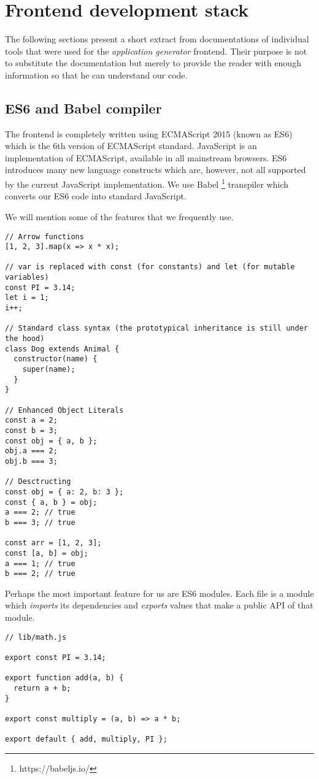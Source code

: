 \chapter{Frontend development stack}
\label{att:devstack}

The following sections present a short extract from documentations of individual tools that were used for the \emph{application generator} frontend. Their purpose is not to substitute the documentation but merely to provide the reader with enough information so that he can understand our code.

\section{ES6 and Babel compiler}

The frontend is completely written using ECMAScript 2015 \cite{es6} (known as ES6) which is the 6th version of ECMAScript standard. JavaScript is an implementation of ECMAScript, available in all mainstream browsers. ES6 introduces many new language constructs which are, however, not all supported by the current JavaScript implementation. We use Babel \footnote{https://babeljs.io/} transpiler which converts our ES6 code into standard JavaScript.

We will mention some of the features that we frequently use.

\begin{verbatim}
// Arrow functions
[1, 2, 3].map(x => x * x);

// var is replaced with const (for constants) and let (for mutable variables)
const PI = 3.14;
let i = 1;
i++;

// Standard class syntax (the prototypical inheritance is still under the hood)
class Dog extends Animal {
  constructor(name) {
    super(name);
  }
}

// Enhanced Object Literals
const a = 2;
const b = 3;
const obj = { a, b };
obj.a === 2;
obj.b === 3;

// Desctructing
const obj = { a: 2, b: 3 };
const { a, b } = obj;
a === 2; // true
b === 3; // true

const arr = [1, 2, 3];
const [a, b] = obj;
a === 1; // true
b === 2; // true
\end{verbatim}

Perhaps the most important feature for us are ES6 modules. Each file is a module which \emph{imports} its dependencies and \emph{exports} values that make a public API of that module.

\begin{verbatim}
// lib/math.js

export const PI = 3.14;

export function add(a, b) {
  return a + b;
}

export const multiply = (a, b) => a * b;

export default { add, multiply, PI };
\end{verbatim}

